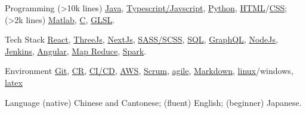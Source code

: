 
\begin{cvskills}
  \cvskill
    {Programming}
    {(>10k lines) 
    \href{https://www.java.com/en/}{Java}, 
    \href{https://www.javascript.com/}{Typescript/Javscript},
    \href{https://www.python.org/}{Python}, 
    \href{https://developer.mozilla.org/en-US/docs/Glossary/HTML5}{HTML}/\href{https://developer.mozilla.org/en-US/docs/Web/CSS}{CSS}; 
    (>2k lines) 
    \href{https://uk.mathworks.com/products/matlab.html}{Matlab}, 
    \href{https://en.wikipedia.org/wiki/C_(programming_language)}{C}, 
    \href{https://www.khronos.org/opengl/wiki/OpenGL_Shading_Language}{GLSL}.}

  \cvskill
    {Tech Stack} %
    {\href{https://reactjs.org/}{React},
    \href{https://threejs.org/}{ThreeJs}, 
    \href{https://nextjs.org/}{NextJs}, 
    \href{https://sass-lang.com/}{SASS/SCSS}, 
    \href{https://en.wikipedia.org/wiki/SQL}{SQL},
    \href{https://graphql.org/}{GraphQL},
    \href{https://nodejs.org/en/}{NodeJs}, 
    \href{https://www.jenkins.io/}{Jenkins},
    \href{https://angular.io/}{Angular}, 
    \href{https://en.wikipedia.org/wiki/MapReduce}{Map Reduce},
    \href{https://spark.apache.org/}{Spark}.}  %



  \cvskill
    {Environment} %
    {\href{https://git-scm.com/}{Git}, 
    \href{https://en.wikipedia.org/wiki/Code_review}{CR}, 
    \href{https://www.redhat.com/en/topics/devops/what-is-ci-cd}{CI/CD}, 
    \href{https://aws.amazon.com/}{AWS}, 
    \href{https://www.scrum.org/resources/what-is-scrum}{Scrum}, 
    \href{https://www.atlassian.com/agile}{agile}, 
    \href{https://en.wikipedia.org/wiki/Markdown}{Markdown}, 
    \href{https://en.wikipedia.org/wiki/Unix}{linux}/windows, 
    \href{https://www.latex-project.org/}{latex}}

  \cvskill
    {Language}
    {(native) Chinese and Cantonese; (fluent) English; (beginner) Japanese.}

  
\end{cvskills}
